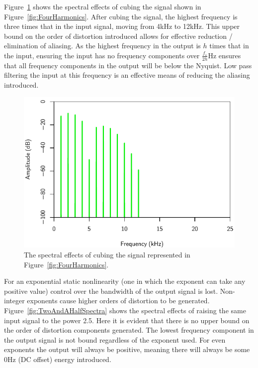 			Figure~\ref{fig:CubedSpectra} shows the spectral effects of cubing the signal shown in
			Figure~\ref{fig:FourHarmonics}. After cubing the signal, the highest frequency is three times that
			in the input signal, moving from 4kHz to 12kHz. This upper bound on the order of distortion
			introduced allows for effective reduction / elimination of aliasing. As the highest frequency in
			the output is $h$ times that in the input, ensuring the input has no frequency components over
			$\frac{f_{s}}{2h}$Hz ensures that all frequency components in the output will be below the Nyquist.
			Low pass filtering the input at this frequency is an effective means of reducing the aliasing
			introduced.

			\begin{figure}[h!]
				\centering
				\includegraphics{chapter5/Images/CubedSpectra.pdf}
				\caption{The spectral effects of cubing the signal represented in
					Figure~\ref{fig:FourHarmonics}.}
				\label{fig:CubedSpectra}
			\end{figure}

			For an exponential static nonlinearity (one in which the exponent can take any positive value)
			control over the bandwidth of the output signal is lost. Non-integer exponents cause higher orders
			of distortion to be generated. Figure~\ref{fig:TwoAndAHalfSpectra} shows the spectral effects of
			raising the same input signal to the power 2.5. Here it is evident that there is no upper bound on
			the order of distortion components generated. The lowest frequency component in the output signal
			is not bound regardless of the exponent used.  For even exponents the output will always be
			positive, meaning there will always be some 0Hz (DC offset) energy introduced.

